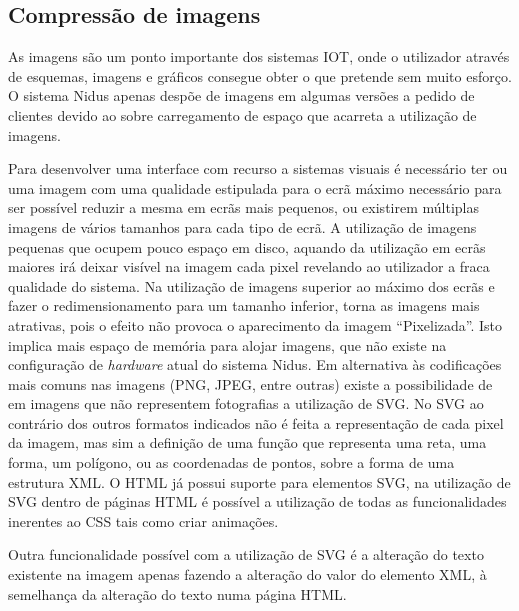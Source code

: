 \subsection{Compressão de imagens}\label{compressimaage}

\par As imagens são um ponto importante dos sistemas IOT, onde o utilizador através de esquemas, imagens e gráficos consegue obter o que pretende sem muito esforço. O sistema Nidus apenas despõe de imagens em algumas versões a pedido de clientes devido ao sobre carregamento de espaço que acarreta a utilização de imagens.
\par Para desenvolver uma interface com recurso a sistemas visuais é necessário ter ou uma imagem com uma qualidade estipulada para o ecrã máximo necessário para ser possível reduzir a mesma em ecrãs mais pequenos, ou existirem múltiplas imagens de vários tamanhos para cada tipo de ecrã. A utilização de imagens pequenas que ocupem pouco espaço em disco, aquando da utilização em ecrãs maiores irá deixar visível na imagem cada pixel revelando ao utilizador a fraca qualidade do sistema. Na utilização de imagens superior ao máximo dos ecrãs e fazer o redimensionamento para um tamanho inferior, torna as imagens mais atrativas, pois o efeito não provoca o aparecimento da imagem “Pixelizada”. Isto implica mais espaço de memória para alojar imagens, que não existe na configuração de \textit{hardware} atual do sistema Nidus. Em alternativa às codificações mais comuns nas imagens (PNG, JPEG, entre outras) existe a possibilidade de em imagens que não representem fotografias a utilização de SVG. No SVG ao contrário dos outros formatos indicados não é feita a representação de cada pixel da imagem, mas sim a definição de uma função que representa uma reta, uma forma, um polígono, ou as coordenadas de pontos, sobre a forma de uma estrutura XML. O HTML já possui suporte  para elementos SVG, na utilização de SVG dentro de páginas HTML é possível a utilização de todas as funcionalidades inerentes ao CSS tais como criar animações. 
\par Outra funcionalidade possível com a utilização de SVG é a alteração do texto existente na imagem apenas fazendo a alteração do valor do elemento XML, à semelhança da alteração do texto numa página HTML.

